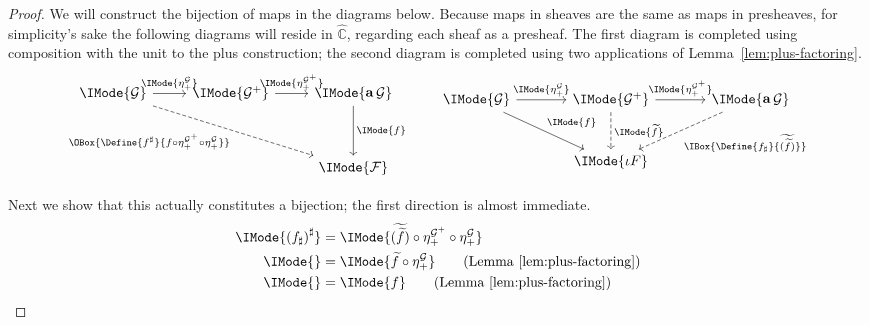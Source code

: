 \documentclass{article}
\newcommand\AIsEq[2]{\IMode{#1} &=\IMode{#2}}
\newcommand\Psh[1]{\widehat{#1}}
\DeclareMathOperator{\Sheafify}{{\mathbf{a}}}
\newcommand\Plus[1]{{#1}^+}
\begin{document}
\begin{proof}
  We will construct the bijection of maps in the diagrams below.
  Because maps in sheaves are the same as maps in presheaves, for
  simplicity's sake the following diagrams will reside in
  $\Psh{\mathbb{C}}$, regarding each sheaf as a presheaf. The first
  diagram is completed using composition with the unit to the plus
  construction; the second diagram is completed using two applications
  of Lemma~\ref{lem:plus-factoring}.
%
  \[
    \begin{tikzcd}
      \IMode{\mathcal{G}}
      \arrow[r,"\IMode{\eta_+^{\mathcal{G}}}"]
      \arrow[ddrr,swap,dashed,"\OBox{\Define{f^\sharp}{f\circ\eta_+^{\Plus{\mathcal{G}}}\circ\eta_+^{\mathcal{G}}}}"]
      &
      \IMode{\Plus{\mathcal{G}}}
      \arrow[r,"\IMode{\eta_+^{\Plus{\mathcal{G}}}}"]
      &
      \IMode{\Sheafify\mathcal{G}}
      \arrow[dd,"\IMode{f}"]
      \\\\
      &
      &
      \IMode{\mathcal{F}}
    \end{tikzcd}
    \qquad
    \begin{tikzcd}[sep=large]
      \IMode{\mathcal{G}}
      \arrow[r,"\IMode{\eta_+^{\mathcal{G}}}"]
      \arrow[dr,"\IMode{f}"]
      &
      \IMode{\Plus{\mathcal{G}}}
      \arrow[d,dashed,"\IMode{\widetilde{f}}"]
      \arrow[r,"\IMode{\eta_+^{\Plus{\mathcal{G}}}}"]
      &
      \IMode{\Sheafify\mathcal{G}}
      \arrow[dl,dashed,"\IBox{\Define{f_\sharp}{\widetilde{(\widetilde{f})}}}"]
      \\
      &
      \IMode{\iota F}
    \end{tikzcd}
  \]

  Next we show that this actually constitutes a bijection; the first
  direction is almost immediate.
  \begin{align*}
    \AIsEq{
      {\left(f_\sharp\right)}^\sharp
    }{
      \widetilde{(\widetilde{f})}\circ\eta_+^{\Plus{\mathcal{G}}}\circ\eta_+^{\mathcal{G}}
    }
    \\
    \AIsEq{
    }{
      \widetilde{f}\circ\eta_+^{\mathcal{G}}
    }
    \tag{Lemma~\ref{lem:plus-factoring}}
    \\
    \AIsEq{
    }{
      f
    }
    \tag{Lemma~\ref{lem:plus-factoring}}
  \end{align*}


\end{proof}
\end{document}
